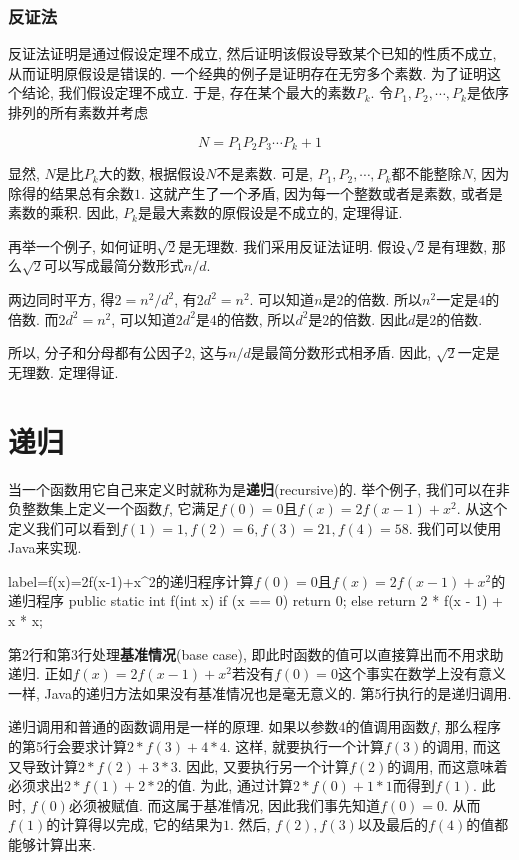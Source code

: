 \documentclass[oneside]{ctexbook}
\begin{document}
\subsubsection{反证法}

反证法证明是通过假设定理不成立, 然后证明该假设导致某个已知的性质不成立, 从而证明原假设是错误的. 一个经典的例子是证明存在无穷多个素数. 为了证明这个结论, 我们假设定理不成立. 于是, 存在某个最大的素数$P_k$. 令$P_1,P_2,\cdots,P_k$是依序排列的所有素数并考虑

\begin{equation*}
    N=P_1P_2P_3\cdots P_k+1
\end{equation*}

显然, $N$是比$P_k$大的数, 根据假设$N$不是素数. 可是, $P_1,P_2,\cdots,P_k$都不能整除$N$, 因为除得的结果总有余数$1$. 这就产生了一个矛盾, 因为每一个整数或者是素数, 或者是素数的乘积. 因此, $P_k$是最大素数的原假设是不成立的, 定理得证.

再举一个例子, 如何证明$\sqrt{2}$是无理数. 我们采用反证法证明. 假设$\sqrt{2}$是有理数, 那么$\sqrt{2}$可以写成最简分数形式$n/d$.

两边同时平方, 得$2=n^2/d^2$, 有$2d^2=n^2$. 可以知道$n$是$2$的倍数. 所以$n^2$一定是$4$的倍数. 而$2d^2=n^2$, 可以知道$2d^2$是$4$的倍数, 所以$d^2$是$2$的倍数. 因此$d$是$2$的倍数.

所以, 分子和分母都有公因子$2$, 这与$n/d$是最简分数形式相矛盾. 因此, $\sqrt{2}$一定是无理数. 定理得证.

\section{递归}\label{递归}

当一个函数用它自己来定义时就称为是\textbf{递归}(recursive)的. 举个例子, 我们可以在非负整数集上定义一个函数$f$, 它满足$f(0)=0$且$f(x)=2f(x-1)+x^2$. 从这个定义我们可以看到$f(1)=1,f(2)=6,f(3)=21,f(4)=58$. 我们可以使用Java来实现.

\begin{myjava}{label={f(x)=2f(x-1)+x^2的递归程序}}{计算$f(0)=0$且$f(x)=2f(x-1)+x^2$的递归程序}
public static int f(int x) {
    if (x == 0)
        return 0;
    else
        return 2 * f(x - 1) + x * x;
}
\end{myjava}

第2行和第3行处理\textbf{基准情况}(base case), 即此时函数的值可以直接算出而不用求助递归. 正如$f(x)=2f(x-1)+x^2$若没有$f(0)=0$这个事实在数学上没有意义一样, Java的递归方法如果没有基准情况也是毫无意义的. 第5行执行的是递归调用.

递归调用和普通的函数调用是一样的原理. 如果以参数$4$的值调用函数$f$, 那么程序的第5行会要求计算$2*f(3)+4*4$. 这样, 就要执行一个计算$f(3)$的调用, 而这又导致计算$2*f(2)+3*3$. 因此, 又要执行另一个计算$f(2)$的调用, 而这意味着必须求出$2*f(1)+2*2$的值. 为此, 通过计算$2*f(0)+1*1$而得到$f(1)$. 此时, $f(0)$必须被赋值. 而这属于基准情况, 因此我们事先知道$f(0)=0$. 从而$f(1)$的计算得以完成, 它的结果为$1$. 然后, $f(2), f(3)$以及最后的$f(4)$的值都能够计算出来.
\end{document}
